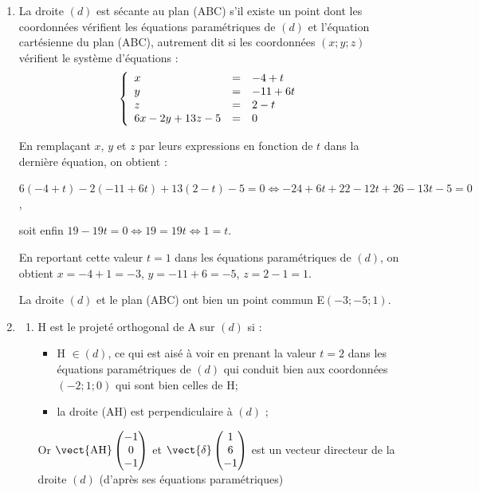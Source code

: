 \begin{enumerate}
	Or $\vect{n} \cdot \vect{p} = 6 \times 8 - 2 \times (- 2) + 13 \times (- 4) = 48 + 4 - 52 = 0$ : d'après la propriété admise les deux vecteurs normaux aux deux plans sont orthogonaux donc les deux plans sont orthogonaux.

	\item La droite $(d)$ est sécante au plan (ABC) s'il existe un point dont les coordonnées vérifient les équations paramétriques de $(d)$ et l'équation cartésienne du plan (ABC), autrement dit si les coordonnées $(x ; y ; z)$ vérifient le système d'équations :
		\[\left\{\begin{array}{l c l}
			x&=&- 4 + t\\
			y&=&- 11 + 6t\\
			z&=&2 - t\\
			6x - 2y + 13z - 5 &=& 0
		\end{array}\right.\]

		En remplaçant $x$, $y$ et $z$ par leurs expressions en fonction de $t$ dans la dernière équation, on obtient :

		$6(- 4 + t)- 2(- 11 + 6t) + 13(2 - t) - 5 = 0 \iff - 24 + 6t + 22 - 12t + 26 - 13t - 5 = 0$,

		soit enfin \quad $19 - 19t = 0 \iff 19 = 19t \iff 1 = t$.

		En reportant cette valeur $t = 1$ dans les équations paramétriques de $(d)$, on obtient \quad $x = - 4 + 1 = - 3$, \: $y = - 11 + 6 = - 5$, \:$z = 2 - 1 = 1$.

		La droite $(d)$ et le plan (ABC) ont bien un point commun E$(- 3 ; -5 ; 1)$.

		\item \begin{enumerate}
			\item H est le projeté orthogonal de A sur $(d)$ si :

			\begin{itemize}
				\item  H $\in (d)$, ce qui est aisé à voir en prenant la valeur $t = 2$ dans les équations paramétriques de $(d)$ qui conduit bien aux coordonnées $(- 2 ; 1 ; 0)$ qui sont bien celles de H;
				\item la droite (AH) est perpendiculaire à $(d)$ ;
			\end{itemize}

			Or $\vect{\text{AH}}\begin{pmatrix}-1\\0\\- 1\end{pmatrix}$ et $\vect{\delta}\begin{pmatrix}1\\6\\- 1\end{pmatrix}$ est un vecteur directeur de la droite $(d)$ (d'après ses équations paramétriques)


\end{enumerate}
\end{enumerate}
